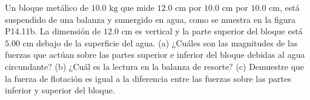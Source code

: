 \item Un bloque metálico de $10.0 \text{ kg}$ que mide $12.0 \text{ cm}$ por $10.0 \text{ cm}$ por $10.0 \text{ cm}$, está suspendido de una balanza y sumergido en agua, como se muestra en la figura P14.11b. La dimensión de $12.0 \text{ cm}$ es vertical y la parte superior del bloque está $5.00 \text{ cm}$ debajo de la superficie del agua. (a) ¿Cuáles son las magnitudes de las fuerzas que actúan sobre las partes superior e inferior del bloque debidas al agua circundante? (b) ¿Cuál es la lectura en la balanza de resorte? (c) Demuestre que la fuerza de flotación es igual a la diferencia entre las fuerzas sobre las partes inferior y superior del bloque.
